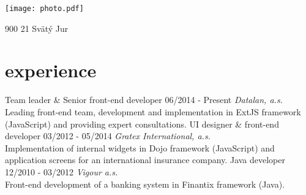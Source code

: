 \documentclass[a4paper]{cv}
\begin{document}


\begin{aside}
	\texttt{[image: photo.pdf]}
	\address{Pannónska 9}{900 21 Svätý Jur}
	\section{\vspace{5mm}         }
\end{aside}

\section{experience}
\begin{entrylist}
	\entry
		{Team leader \& Senior front-end developer}
		{06/2014 - Present}
		{\emph{Datalan, a.s.}\\
		Leading front-end team, development and implementation in ExtJS framework (JavaScript) and providing expert consultations.}
	\entry
		{UI designer \& front-end developer}
		{03/2012 - 05/2014}
		{\emph{Gratex International, a.s.}\\
		Implementation of internal widgets in Dojo framework (JavaScript) and application screens for an international insurance company.}
	\entry
		{Java developer}
		{12/2010 - 03/2012}
		{\emph{Vigour a.s.}\\
		Front-end development of a banking system in Finantix framework (Java).}
\end{entrylist}

\end{document}
